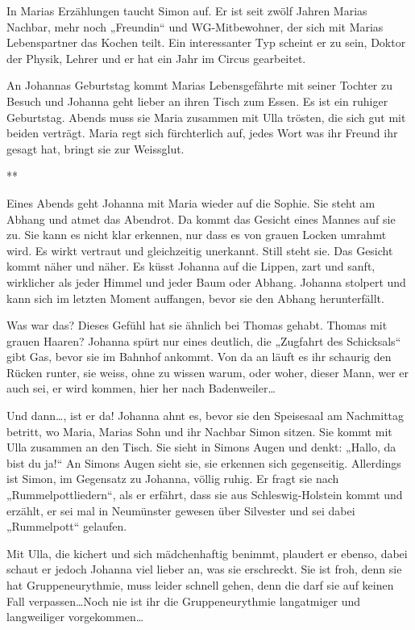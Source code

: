 \documentclass[10pt,titlepage,a5paper]{book}
\newcommand{\sterne}{\par{\centering ***\par}}
\begin{document}
In Marias Erzählungen taucht Simon auf. Er ist seit zwölf Jahren Marias Nachbar, mehr noch „Freundin“ und WG-Mitbewohner, der sich mit Marias Lebenspartner das Kochen teilt. Ein interessanter Typ scheint er zu sein, Doktor der Physik, Lehrer und er hat ein Jahr im Circus gearbeitet.

An Johannas Geburtstag kommt Marias Lebensgefährte mit seiner Tochter zu Besuch und Johanna geht lieber an ihren Tisch zum Essen. Es ist ein ruhiger Geburtstag. Abends muss sie Maria zusammen mit Ulla trösten, die sich gut mit beiden verträgt. Maria regt sich fürchterlich auf, jedes Wort was ihr Freund ihr gesagt hat, bringt sie zur Weissglut.

\sterne

Eines Abends geht Johanna mit Maria wieder auf die Sophie. Sie steht am Abhang und atmet das Abendrot. Da kommt das Gesicht eines Mannes auf sie zu. Sie kann es nicht klar erkennen, nur dass es von grauen Locken umrahmt wird. Es wirkt vertraut und gleichzeitig unerkannt. Still steht sie. Das Gesicht kommt  näher und näher. Es küsst Johanna auf die Lippen, zart und sanft, wirklicher als jeder Himmel und jeder Baum oder Abhang. Johanna stolpert und kann sich im letzten Moment auffangen, bevor sie den Abhang herunterfällt.

Was war das? Dieses Gefühl hat sie ähnlich bei Thomas gehabt. Thomas mit grauen Haaren? Johanna spürt nur eines deutlich, die „Zugfahrt des Schicksals“ gibt Gas, bevor sie im Bahnhof ankommt. Von da an läuft es ihr schaurig den Rücken runter, sie weiss, ohne zu wissen warum, oder woher, dieser Mann, wer er auch sei, er wird kommen, hier her nach Badenweiler\dots 

Und dann\dots , ist er da! Johanna ahnt es, bevor sie den Speisesaal am Nachmittag betritt, wo Maria, Marias Sohn und ihr Nachbar Simon sitzen. Sie kommt mit Ulla zusammen an den Tisch. Sie sieht in Simons Augen und denkt: „Hallo, da bist du ja!“ An Simons Augen sieht sie, sie erkennen sich gegenseitig. Allerdings ist Simon, im Gegensatz zu Johanna, völlig ruhig. Er fragt sie nach „Rummelpottliedern“, als er erfährt, dass sie aus Schleswig-Holstein kommt und erzählt, er sei mal in Neumünster gewesen über Silvester und sei dabei „Rummelpott“ gelaufen.

Mit Ulla, die kichert und sich mädchenhaftig benimmt, plaudert er ebenso, dabei schaut er jedoch Johanna viel lieber an, was sie erschreckt. Sie ist froh, denn sie hat Gruppeneurythmie, muss leider  schnell gehen, denn die darf sie auf keinen Fall verpassen\dots  Noch nie ist ihr die Gruppeneurythmie langatmiger und langweiliger vorgekommen\dots 
\end{document}
